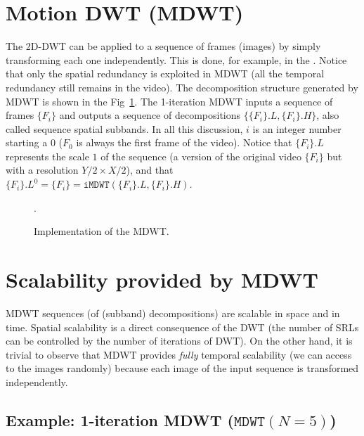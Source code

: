 

\section{Motion DWT (MDWT)}

The 2D-DWT can be applied to a sequence of frames (images) by simply
transforming each one independently. This is done, for example, in the
. Notice
that only the spatial redundancy is exploited in MDWT (all the
temporal redundancy still remains in the video). The decomposition
structure generated by MDWT is shown in the Fig~\ref{fig:MDWT}. The
1-iteration MDWT inputs a sequence of frames $\{F_i\}$ and outputs a
sequence of decompositions $\{\{F_i\}.L, \{F_i\}.H\}$, also called
sequence spatial subbands. In all this discussion, $i$ is an integer
number starting a $0$ ($F_0$ is always the first frame of the
video). Notice that $\{F_i\}.L$ represents the scale $1$ of the
sequence (a version of the original video $\{F_i\}$ but with a
resolution $Y/2\times X/2$), and that $\{F_i\}.L^0 = \{F_i\} =
\mathtt{iMDWT}(\{F_i\}.L,\{F_i\}.H )$.

\begin{figure}
  \centering {}
  .
  \caption{Implementation of the MDWT.} %
  \label{fig:MDWT}
\end{figure}


\section{Scalability provided by MDWT}

MDWT sequences (of (subband) decompositions) are scalable in space and
in time. Spatial scalability is a direct consequence of the DWT
(the number of SRLs can be controlled by the number of iterations of
DWT). On the other hand, it is trivial to observe that MDWT
provides \emph{fully} temporal scalability (we can access to the
images randomly) because each image of the input sequence is
transformed independently.



\subsection*{Example: 1-iteration MDWT ($\mathtt{MDWT}(N=5)$)}

